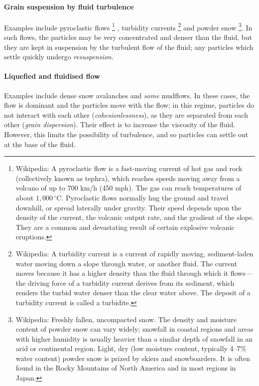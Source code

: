 \paragraph{Grain suspension by fluid turbulence} Examples include pyroclastic
flows
\footnote{Wikipedia: A pyroclastic flow is a fast-moving current of hot gas and
rock (collectively known as tephra), which reaches speeds moving away from a
volcano of up to 700 km/h (450 mph). The gas can reach temperatures of about
$1,000\,^{\circ}\mathrm{C}$. Pyroclastic flows normally hug the ground and travel downhill, or
spread laterally under gravity. Their speed depends upon the density of the
current, the volcanic output rate, and the gradient of the slope. They are a
common and devastating result of certain explosive volcanic eruptions.}
, turbidity currents
\footnote{Wikipedia: A turbidity current is a current of rapidly moving,
sediment-laden water moving down a slope through water, or another fluid. The
current moves because it has a higher density than the fluid through which it
flows—the driving force of a turbidity current derives from its sediment, which
renders the turbid water denser than the clear water above. The deposit of a
turbidity current is called a turbidite.}
and powder snow
\footnote{Wikipedia: Freshly fallen, uncompacted snow. The density and moisture
content of powder snow can vary widely; snowfall in coastal regions and areas
with higher humidity is usually heavier than a similar depth of snowfall in an
arid or continental region. Light, dry (low moisture content, typically 4–7\%
water content) powder snow is prized by skiers and snowboarders. It is often
found in the Rocky Mountains of North America and in most regions in Japan.}. 
In such flows, the particles may be very concentrated and denser than the fluid, but
they are kept in suspension by the turbulent flow of the fluid; any particles
which settle quickly undergo \textit{resuspension}.

\paragraph{Liquefied and fluidised flow} Examples include dense snow avalanches
and \textit{some} mudflows. In these cases, the flow is dominant and the
particles move with the flow; in this regime, particles do not interact with
each other (\textit{cohesionlessness}), as they are separated from each other
(\textit{grain dispersion}). Their effect is to increase the viscosity of the
fluid. However, this limits the possibility of turbulence, and so particles can 
settle out at the base of the fluid.

